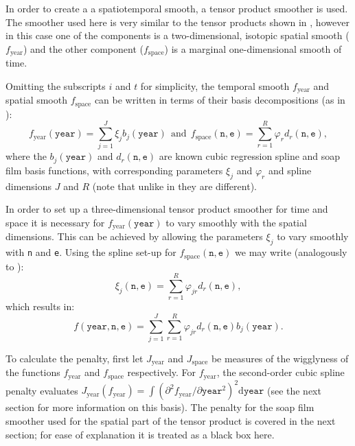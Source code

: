 In order to create a a spatiotemporal smooth, a tensor product smoother is used. The smoother used here is very similar to the tensor products shown in , however in this case one of the components is a two-dimensional, isotopic spatial smooth ($f_\text{year}$) and the other component ($f_\text{space}$) is a marginal one-dimensional smooth of time. 

Omitting the subscripts $i$ and $t$ for simplicity, the temporal smooth $f_\text{year}$ and spatial smooth $f_\text{space}$ can be written in terms of their basis decompositions (as in ):
\begin{equation*}
f_\text{year}(\texttt{year})=\sum_{j=1}^J \xi_j b_j(\texttt{year}) \ \ \text{and} \ \ f_\text{space}(\texttt{n},\texttt{e})=\sum_{r=1}^R \varphi_r d_r(\texttt{n},\texttt{e}),
\end{equation*}
where the $b_j(\texttt{year})$ and $d_r(\texttt{n},\texttt{e})$ are known cubic regression spline and soap film basis functions, with corresponding parameters $\xi_j$ and $\varphi_r$ and spline dimensions $J$ and $R$ (note that unlike in  they are different). 

In order to set up a three-dimensional tensor product smoother for time and space it is necessary for $f_\text{year}(\texttt{year})$ to vary smoothly with the spatial dimensions. This can be achieved by allowing the parameters $\xi_j$ to vary smoothly with \texttt{n} and \texttt{e}. Using the spline set-up for $f_\text{space}(\texttt{n},\texttt{e})$ we may write (analogously to ):
$$
\xi_j(\texttt{n},\texttt{e})=\sum_{r=1}^R \varphi_{jr} d_r(\texttt{n},\texttt{e}),
$$    
which results in:
$$
f(\texttt{year},\texttt{n},\texttt{e})=\sum_{j=1}^J \sum_{r=1}^R \varphi_{jr} d_r(\texttt{n},\texttt{e}) b_j(\texttt{year}). 
$$

To calculate the penalty, first let $J_\text{year}$ and $J_\text{space}$ be measures of the wigglyness of the functions $f_\text{year}$ and $f_\text{space}$ respectively. For $f_\text{year}$, the second-order cubic spline penalty evaluates $J_\text{year}(f_\text{year})=\int\left( \partial^2 f_\text{year}/\partial \texttt{year}^2 \right)^2 \text{d}\texttt{year}$ (see the next section for more information on this basis). The penalty for the soap film smoother used for the spatial part of the tensor product is covered in the next section; for ease of explanation it is treated as a black box here.

